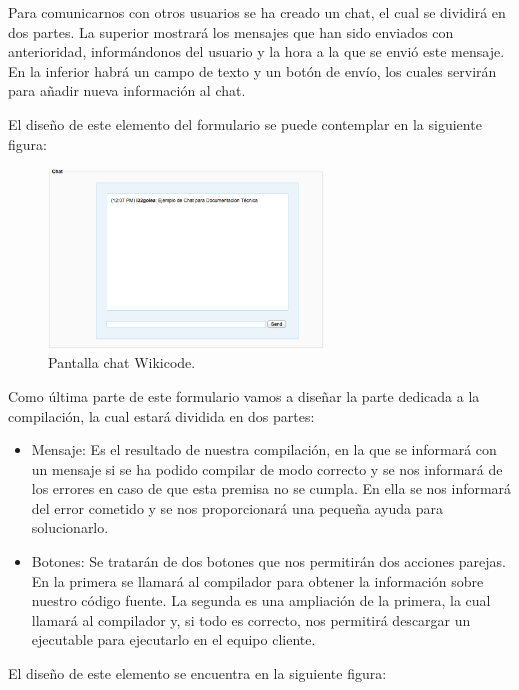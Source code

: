 Para comunicarnos con otros usuarios se ha creado un chat, el cual se dividirá en dos partes. La superior mostrará los mensajes que han sido enviados con anterioridad, informándonos del usuario y la hora a la que se envió este mensaje. En la inferior habrá un campo de texto y un botón de envío, los cuales servirán para añadir nueva información al chat.

El diseño de este elemento del formulario se puede contemplar en la siguiente figura:

\begin{figure}[h]
	\begin{center}
	\includegraphics[width=0.65\textwidth]{./img/c4chat.eps}
	\caption{Pantalla chat Wikicode.}
	\end{center}
\end{figure}

Como última parte de este formulario vamos a diseñar la parte dedicada a la compilación, la cual estará dividida en dos partes:

\begin{itemize}
	\item Mensaje: Es el resultado de nuestra compilación, en la que se informará con un mensaje si se ha podido compilar de modo correcto y se nos informará de los errores en caso de que esta premisa no se cumpla. En ella se nos informará del error cometido y se nos proporcionará una pequeña ayuda para solucionarlo.
	\item Botones: Se tratarán de dos botones que nos permitirán dos acciones parejas. En la primera se llamará al compilador para obtener la información sobre nuestro código fuente. La segunda es una ampliación de la primera, la cual llamará al compilador y, si todo es correcto, nos permitirá descargar un ejecutable para ejecutarlo en el equipo cliente.
\end{itemize}

El diseño de este elemento se encuentra en la siguiente figura:

